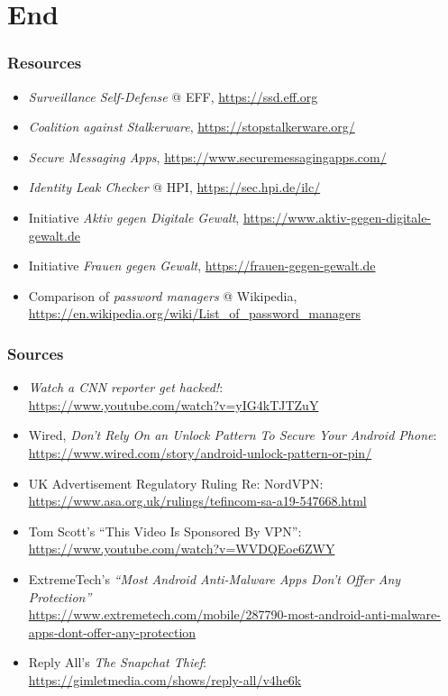 \documentclass[aspectratio=169,dvipsnames]{beamer}
\newcommand{\backupbegin}{
   \newcounter{finalframe}
   \setcounter{finalframe}{\value{framenumber}}
}
\newcommand{\backupend}{
   \setcounter{framenumber}{\value{finalframe}}
}
\begin{document}
\appendix
\backupbegin

\section{End}

\begin{frame}
\frametitle{Resources}

\begin{itemize}
\item \emph{Surveillance Self-Defense} @ EFF, \url{https://ssd.eff.org}
\item \emph{Coalition against Stalkerware}, \url{https://stopstalkerware.org/}
\item \emph{Secure Messaging Apps}, \url{https://www.securemessagingapps.com/}
\item \emph{Identity Leak Checker} @ HPI, \url{https://sec.hpi.de/ilc/}
\item Initiative \emph{Aktiv gegen Digitale Gewalt}, \url{https://www.aktiv-gegen-digitale-gewalt.de}
\item Initiative \emph{Frauen gegen Gewalt}, \url{https://frauen-gegen-gewalt.de}
\item Comparison of \emph{password managers} @ Wikipedia, \url{https://en.wikipedia.org/wiki/List_of_password_managers}
\end{itemize}

\end{frame}

\begin{frame}
\frametitle{Sources}
\footnotesize

\begin{itemize}
\item \emph{Watch a CNN reporter get hacked!}:\\
\url{https://www.youtube.com/watch?v=yIG4kTJTZuY}
\item Wired, \emph{Don't Rely On an Unlock Pattern To Secure Your Android Phone}: \\
\url{https://www.wired.com/story/android-unlock-pattern-or-pin/}
\item UK Advertisement Regulatory Ruling Re: NordVPN:\\
\url{https://www.asa.org.uk/rulings/tefincom-sa-a19-547668.html}
\item Tom Scott's ``This Video Is Sponsored By VPN'':\\
\url{https://www.youtube.com/watch?v=WVDQEoe6ZWY}
\item ExtremeTech's \emph{``Most Android Anti-Malware Apps Don’t Offer Any Protection''}\\
\url{https://www.extremetech.com/mobile/287790-most-android-anti-malware-apps-dont-offer-any-protection}
\item Reply All's \emph{The Snapchat Thief}:\\
\url{https://gimletmedia.com/shows/reply-all/v4he6k}
\end{itemize}

\end{frame}

\backupend
\end{document}
